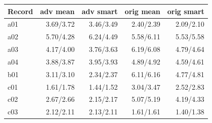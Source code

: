 \begin{tabular}{lrrrr}
\toprule
Record & adv mean & adv smart & orig mean & orig smart \\
\midrule
a01 & 3.69/3.72 & 3.46/3.49 & 2.40/2.39 & 2.09/2.10 \\
a02 & 5.70/4.28 & 6.24/4.49 & 5.58/6.11 & 5.53/5.58 \\
a03 & 4.17/4.00 & 3.76/3.63 & 6.19/6.08 & 4.79/4.64 \\
a04 & 3.88/3.87 & 3.95/3.93 & 4.89/4.92 & 4.59/4.61 \\
b01 & 3.11/3.10 & 2.34/2.37 & 6.11/6.16 & 4.77/4.81 \\
c01 & 1.61/1.78 & 1.44/1.52 & 3.04/3.47 & 2.52/2.83 \\
c02 & 2.67/2.66 & 2.15/2.17 & 5.07/5.19 & 4.19/4.33 \\
c03 & 2.12/2.11 & 2.13/2.11 & 1.61/1.61 & 1.40/1.38 \\
\bottomrule
\end{tabular}
